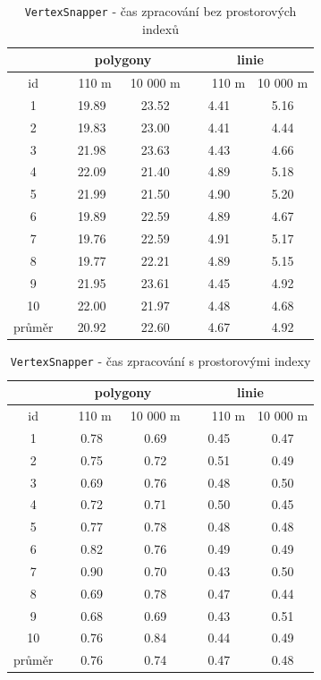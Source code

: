 \begin{table}[ht]
 \centering
   \caption{\texttt{Vertex\-Snapper} -
	    čas zpracování bez prostorových indexů}
  \begin{tabular}{|c|c|c|c|c|}
   \hline
      & \multicolumn{2}{c|}{polygony} & 
 	\multicolumn{2}{c|}{linie} \\
   \hline
    id  &  ~~110 m~ & 10 000 m & ~~~110 m & 10 000 m\\
   \hline
   \hline
 1  & 19.89 & 23.52 & 4.41 & 5.16 \\ 
 2  & 19.83 & 23.00 & 4.41 & 4.44 \\
 3  & 21.98 & 23.63 & 4.43 & 4.66 \\
 4  & 22.09 & 21.40 & 4.89 & 5.18 \\
 5  & 21.99 & 21.50 & 4.90 & 5.20 \\
 6  & 19.89 & 22.59 & 4.89 & 4.67 \\
 7  & 19.76 & 22.59 & 4.91 & 5.17 \\
 8  & 19.77 & 22.21 & 4.89 & 5.15 \\
 9  & 21.95 & 23.61 & 4.45 & 4.92 \\
 10 & 22.00 & 21.97 & 4.48 & 4.68 \\
   \hline
   \hline
   průměr & 20.92 & 22.60 & 4.67 & 4.92 \\
   \hline
  \end{tabular}
   \label{tab:vs-bez}
\end{table}
 
\begin{table}[ht]
 \centering
   \caption{\texttt{Vertex\-Snapper} -
	    čas zpracování s prostorovými indexy}
  \begin{tabular}{|c|c|c|c|c|}
   \hline
      & \multicolumn{2}{c|}{polygony} & 
 	\multicolumn{2}{c|}{linie} \\
   \hline
    id  &  ~~110 m~ & 10 000 m & ~~~110 m & 10 000 m\\
   \hline
   \hline
   1  & 0.78 & 0.69 &  0.45 & 0.47 \\
   2  & 0.75 & 0.72 &  0.51 & 0.49 \\
   3  & 0.69 & 0.76 &  0.48 & 0.50 \\
   4  & 0.72 & 0.71 &  0.50 & 0.45 \\
   5  & 0.77 & 0.78 &  0.48 & 0.48 \\
   6  & 0.82 & 0.76 &  0.49 & 0.49 \\
   7  & 0.90 & 0.70 &  0.43 & 0.50 \\
   8  & 0.69 & 0.78 &  0.47 & 0.44 \\
   9  & 0.68 & 0.69 &  0.43 & 0.51 \\
   10 & 0.76 & 0.84 &  0.44 & 0.49 \\
   \hline
   \hline
   průměr & 0.76 & 0.74 & 0.47 & 0.48 \\
   \hline
  \end{tabular}
   \label{tab:vs-s}
\end{table}
 
